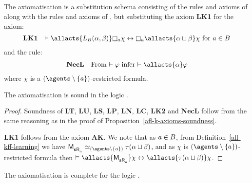 \subsection{\classKFF{}}

\begin{definition}\label{afl-kff-axioms}
The axiomatisation \axiomAflKFF{} is a substitution schema consisting of the rules and axioms of \axiomKFF{} along with the rules and axioms of \axiomAflK{}, but substituting the \axiomAflK{} axiom {\bf LK1} for the axiom:
$$
\begin{array}{rl}
    {\bf LK1} & \proves \allacts{\learns_\agentsB (\alpha, \beta)} \necessaryA \chi \iff \necessaryA \allacts{\alpha \choice \beta} \chi \text{ for } \agentA \in \agentsB\\
\end{array}
$$
and the rule:
$$
\begin{array}{rl}
    {\bf NecL} & \text{From $\proves \phi$ infer $\proves \allacts{\alpha} \phi$}
\end{array}
$$
where $\chi$ is a $(\agents \setminus \{\agentA\})$-restricted formula.
\end{definition}

\begin{proposition}\label{afl-kff-axioms-soundness}
The axiomatisation \axiomAflKFF{} is sound in the logic \logicAmlKFF{}.
\end{proposition}

\begin{proof}
Soundness of {\bf LT}, {\bf LU}, {\bf LS}, {\bf LP}, {\bf LN}, {\bf LC}, {\bf LK2} and {\bf NecL} follow from the same reasoning as in the proof of Proposition~\ref{afl-k-axioms-soundness}.

{\bf LK1} follows from the \axiomAmlKFF{} axiom {\bf AK}.
We note that as $a \in B$, from Definition~\ref{afl-kff-learning} we have $\aPModel{\aStateS \aAccessibility{\agentA}} \bisimilar[(\agents \setminus \{\agentA\})] \tau(\alpha \choice \beta)$, and as $\chi$ is $(\agents \setminus \{\agentA\})$-restricted formula then $\entails \allacts{\aPModel{\aStateS \aAccessibility{\agentA}}} \chi \iff \allacts{\tau(\alpha \choice \beta)} \chi$.
\end{proof}

\begin{proposition}\label{afl-kff-axioms-completeness}
The axiomatisation \axiomAflKFF{} is complete for the logic \logicAmlKFF{}.
\end{proposition}

